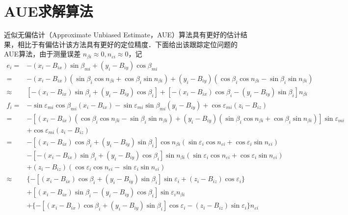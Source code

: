 \section{AUE求解算法}
近似无偏估计（Approximate Unbiased Estimate，AUE）算法具有更好的估计结果，相比于有偏估计该方法具有更好的定位精度．下面给出该跟踪定位问题的AUE算法，由于测量误差 $n_{\beta i} \approx 0,n_{\varepsilon i} \approx 0$，记
\begin{equation}
	\begin{split}
		e_i =& -(x_i-B_{ix})\sin\beta_{mi} + (y_i -B_{iy})\cos\beta_{mi} \\
		=&-(x_i -B_{ix})(\sin\beta_i\cos n_{\beta i}+ \cos\beta_i\sin n_{\beta i}) + (y_i -B_{iy})(\cos\beta_i\cos n_{\beta i} - \sin\beta_i \sin n_{\beta i}) \\
		\approx & [-(x_i-B_{ix})\sin\beta_i + (y_i -B_{iy})\cos\beta_i] + [-(x_i -B_{ix})\cos\beta_i -(y_i - B_{iy})\sin\beta_i]n_{\beta i} 
	\end{split}
\end{equation}
\begin{equation}
	\begin{split}
		f_i =& -\sin\varepsilon_{mi}\cos\beta_{mi}(x_i-B_{ix})-\sin\varepsilon_{mi}\sin\beta_{mi}(y_i -B_{iy}) + \cos\varepsilon_{mi}(z_i - B_{iz}) \\
		=&-[(x_i - B_{ix})(\cos\beta_i\cos n_{\beta i} -\sin\beta_i \sin n_{\beta i}) + (y_i -B_{iy})(\sin\beta_i\cos n_{\beta i} + \cos\beta_i \sin n_{\beta i})]\sin \varepsilon_{mi} \\
		&+ \cos\varepsilon_{mi}(z_i -B_{iz}) \\
		=&-[(x_i -B_{ix})\cos\beta_i + (y_i - B_{iy})\sin\beta_i]\cos n_{\beta i}(\sin\varepsilon_i \cos n_{\varepsilon i} + \cos\varepsilon_i \sin n_{\varepsilon i}) \\
		& - [-(x_i -B_{ix})\sin\beta_i + (y_i -B_{iy})\cos\beta_i]\sin n_{\beta i} (\sin\varepsilon_i \cos n_{\varepsilon i} + \cos \varepsilon_i \sin n_{\varepsilon i}) \\
		& + (z_i - B_{iz})(\cos\varepsilon_i \cos n_{\varepsilon i} - \sin\varepsilon_i \sin n_{\varepsilon i}) \\
		\approx & \lbrace -[(x_i -B_{ix})\cos\beta_i + (y_i -B_{iy})\sin\beta_i]\sin\varepsilon_i + (z_i -B_{iz})\cos\varepsilon_i \rbrace \\
		&+[(x_i -B_{ix})\sin\beta_i - (y_i -B_{iy})\cos\beta_i]\sin\varepsilon_i n_{\beta i} \\
		&+\lbrace -[(x_i -B_{ix})\cos\beta_i + (y_i -B_{iy})\sin\beta_i]\cos\varepsilon_i - (z_i -B_{iz})\sin\varepsilon_i \rbrace n_{\varepsilon i} 
	\end{split}
\end{equation}

